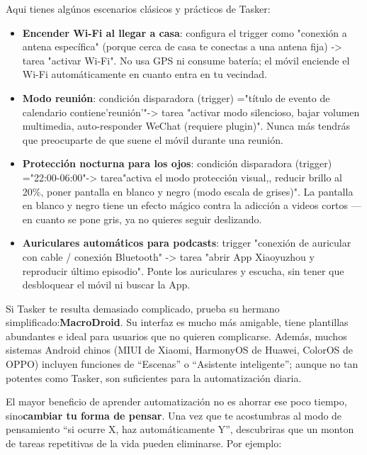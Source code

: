 Aqui tienes algúnos escenarios clásicos y prácticos de Tasker:

\begin{itemize}
  \item \textbf{Encender Wi-Fi al llegar a casa}: configura el trigger como "conexión a antena específica" (porque cerca de casa te conectas a una antena fija) -> tarea "activar Wi-Fi". No usa GPS ni consume batería; el móvil enciende el Wi-Fi automáticamente en cuanto entra en tu vecindad.
  \item \textbf{Modo reunión}: condición disparadora (trigger) ="título de evento de calendario contiene'reunión'"-> tarea "activar modo silencioso, bajar volumen multimedia, auto-responder WeChat (requiere plugin)". Nunca más tendrás que preocuparte de que suene el móvil durante una reunión.
  \item \textbf{Protección nocturna para los ojos}: condición disparadora (trigger) ="22:00-06:00"-> tarea"activa el modo protección visual,, reducir brillo al 20\%, poner pantalla en blanco y negro (modo escala de grises)". La pantalla en blanco y negro tiene un efecto mágico contra la adicción a videos cortos — en cuanto se pone gris, ya no quieres seguir deslizando.
  \item \textbf{Auriculares automáticos para podcasts}: trigger "conexión de auricular con cable / conexión Bluetooth" -> tarea "abrir App Xiaoyuzhou y reproducir último episodio". Ponte los auriculares y escucha, sin tener que desbloquear el móvil ni buscar la App.
\end{itemize}

Si Tasker te resulta demasiado complicado, prueba su hermano simplificado:\textbf{MacroDroid}. Su interfaz es mucho más amigable, tiene plantillas abundantes e ideal para usuarios que no quieren complicarse. Además, muchos sistemas Android chinos (MIUI de Xiaomi, HarmonyOS de Huawei, ColorOS de OPPO) incluyen funciones de “Escenas” o “Asistente inteligente”; aunque no tan potentes como Tasker, son suficientes para la automatización diaria.


El mayor beneficio de aprender automatización no es ahorrar ese poco tiempo, sino\textbf{cambiar tu forma de pensar}. Una vez que te acostumbras al modo de pensamiento “si ocurre X, haz automáticamente Y”, descubriras que un monton de tareas repetitivas de la vida pueden eliminarse. Por ejemplo:

